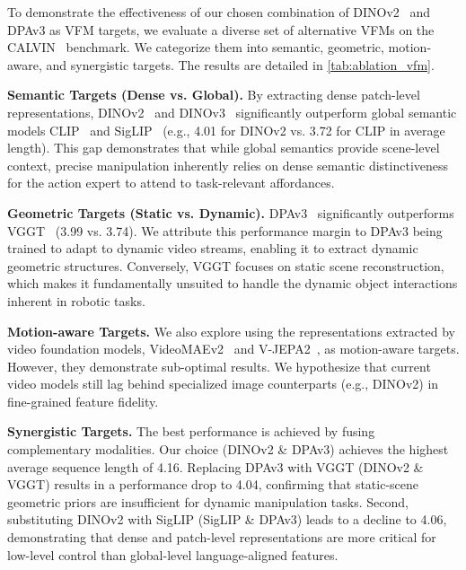 
\label{sec:ablation_vfm}

To demonstrate the effectiveness of our chosen combination of DINOv2~\cite{oquab2023dinov2} and DPAv3 as VFM targets, we evaluate a diverse set of alternative VFMs on the CALVIN~\cite{mees2022calvin} benchmark. We categorize them into semantic, geometric, motion-aware, and synergistic targets. The results are detailed in \cref{tab:ablation_vfm}.

\noindent \textbf{Semantic Targets (Dense vs. Global).} By extracting dense patch-level representations,
DINOv2~\cite{oquab2023dinov2} and DINOv3~\cite{simeoni2025dinov3} significantly outperform global semantic models CLIP~\cite{radford2021learning} and SigLIP~\cite{zhai2023sigmoid} (e.g., 4.01 for DINOv2 vs. 3.72 for CLIP in average length). This gap demonstrates that while global semantics provide scene-level context, precise manipulation inherently relies on dense semantic distinctiveness for the action expert to attend to task-relevant affordances. 

\noindent \textbf{Geometric Targets (Static vs. Dynamic).} 
DPAv3~\cite{lin2025depth} significantly outperforms VGGT~\cite{wang2025vggt} (3.99 vs. 3.74). We attribute this performance margin to DPAv3 being trained to adapt to dynamic video streams, enabling it to extract dynamic geometric structures. Conversely, VGGT focuses on static scene reconstruction, which makes it fundamentally unsuited to handle the dynamic object interactions inherent in robotic tasks.

\noindent \textbf{Motion-aware Targets.} 
We also explore using the representations extracted by video foundation models, VideoMAEv2~\cite{wang2023videomae} and V-JEPA2~\cite{assran2025v}, as motion-aware targets. However, they demonstrate sub-optimal results. We hypothesize that current video models still lag behind specialized image counterparts (e.g., DINOv2) in fine-grained feature fidelity.

\noindent \textbf{Synergistic Targets.} 
The best performance is achieved by fusing complementary modalities. Our choice (DINOv2 \& DPAv3) achieves the highest average sequence length of 4.16. Replacing DPAv3 with VGGT (DINOv2 \& VGGT) results in a performance drop to 4.04, confirming that static-scene geometric priors are insufficient for dynamic manipulation tasks.
Second, substituting DINOv2 with SigLIP (SigLIP \& DPAv3) leads to a decline to 4.06, demonstrating that dense and patch-level representations are more critical for low-level control than global-level language-aligned features.

